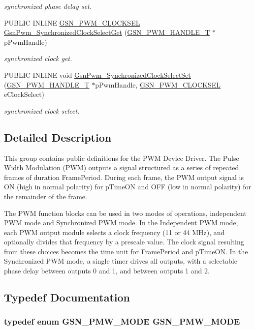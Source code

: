 \begin{DoxyCompactItemize}
\begin{DoxyCompactList}\small\item\em synchronized phase delay set. \end{DoxyCompactList}\item 
PUBLIC INLINE \hyperlink{a00650_gafda5110eb592af71b799ed22c7ebf902}{GSN\_\-PWM\_\-CLOCKSEL} \hyperlink{a00650_gaabf0051a6ce2882eb1a734c029c7d4b9}{GsnPwm\_\-SynchronizedClockSelectGet} (\hyperlink{a00182}{GSN\_\-PWM\_\-HANDLE\_\-T} $\ast$pPwmHandle)
\begin{DoxyCompactList}\small\item\em synchronized clock get. \end{DoxyCompactList}\item 
PUBLIC INLINE void \hyperlink{a00650_ga177c51254727205e45ddd643abd59b14}{GsnPwm\_\-SynchronizedClockSelectSet} (\hyperlink{a00182}{GSN\_\-PWM\_\-HANDLE\_\-T} $\ast$pPwmHandle, \hyperlink{a00650_gafda5110eb592af71b799ed22c7ebf902}{GSN\_\-PWM\_\-CLOCKSEL} eClockSelect)
\begin{DoxyCompactList}\small\item\em synchronized clock select. \end{DoxyCompactList}\end{DoxyCompactItemize}


\subsection{Detailed Description}
This group contains public definitions for the PWM Device Driver. The Pulse Width Modulation (PWM) outputs a signal structured as a series of repeated frames of duration FramePeriod. During each frame, the PWM output signal is ON (high in normal polarity) for pTimeON and OFF (low in normal polarity) for the remainder of the frame. \par


The PWM function blocks can be used in two modes of operations, independent PWM mode and Synchronized PWM mode. In the Independent PWM mode, each PWM output module selects a clock frequency (11 or 44 MHz), and optionally divides that frequency by a prescale value. The clock signal resulting from these choices becomes the time unit for FramePeriod and pTimeON. In the Synchronized PWM mode, a single timer drives all outputs, with a selectable phase delay between outputs 0 and 1, and between outputs 1 and 2. 

\subsection{Typedef Documentation}
\hypertarget{a00650_gae68dbc7fb3fb9bb56a6d4abcbbba43b2}{
\subsubsection[{GSN\_\-PMW\_\-MODE}]{\setlength{\rightskip}{0pt plus 5cm}typedef enum {\bf GSN\_\-PMW\_\-MODE} {\bf GSN\_\-PMW\_\-MODE}}}
\label{a00650_gae68dbc7fb3fb9bb56a6d4abcbbba43b2}



